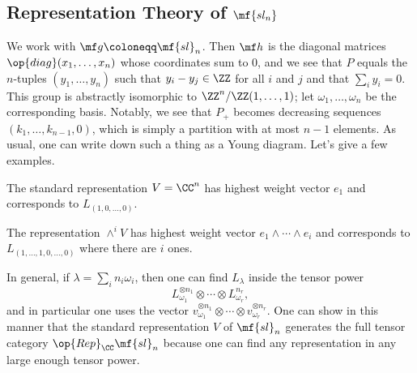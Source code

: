 \documentclass[../notes.tex]{subfiles}
\begin{document}
\subsection{Representation Theory of \texorpdfstring{$\mf{sl_n}$}{sln}}
We work with $\mf g\coloneqq\mf{sl}_n$. Then $\mf h$ is the diagonal matrices $\op{diag}(x_1,\ldots,x_n)$ whose coordinates sum to $0$, and we see that $P$ equals the $n$-tuples $(y_1,\ldots,y_n)$ such that $y_i-y_j\in\ZZ$ for all $i$ and $j$ and that $\sum_iy_i=0$. This group is abstractly isomorphic to $\ZZ^n/\ZZ(1,\ldots,1)$; let $\omega_1,\ldots,\omega_n$ be the corresponding basis. Notably, we see that $P_+$ becomes decreasing sequences $(k_1,\ldots,k_{n-1},0)$, which is simply a partition with at most $n-1$ elements. As usual, one can write down such a thing as a Young diagram. Let's give a few examples.
\begin{example}
	The standard representation $V=\CC^n$ has highest weight vector $e_1$ and corresponds to $L_{(1,0,\ldots,0)}$.
\end{example}
\begin{example}
	The representation $\land^iV$ has highest weight vector $e_1\land\cdots\land e_i$ and corresponds to $L_{(1,\ldots,1,0,\ldots,0)}$ where there are $i$ ones.
\end{example}
In general, if $\lambda=\sum_in_i\omega_i$, then one can find $L_\lambda$ inside the tensor power
\[L_{\omega_1}^{\otimes n_1}\otimes\cdots\otimes L_{\omega_r}^{n_r},\]
and in particular one uses the vector $v_{\omega_1}^{\otimes n_1}\otimes\cdots\otimes v_{\omega_r}^{\otimes n_r}$. One can show in this manner that the standard representation $V$ of $\mf{sl}_n$ generates the full tensor category $\op{Rep}_\CC\mf{sl}_n$ because one can find any representation in any large enough tensor power.
\end{document}
